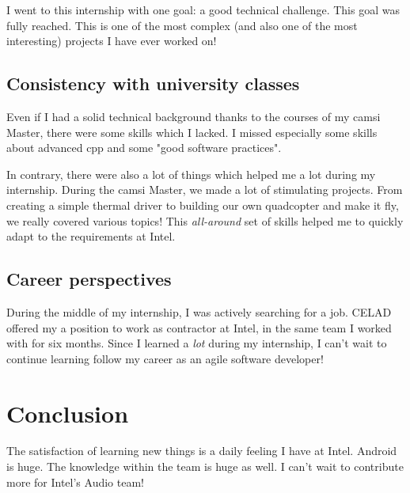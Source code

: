I went to this internship with one goal: a good technical challenge. This goal
was fully reached. This is one of the most complex (and also one of the most
interesting) projects I have ever worked on!

\subsection{Consistency with university classes}
Even if I had a solid technical background thanks to the courses of my
\gls{camsi} Master, there were some skills which I lacked.
I missed especially some skills about advanced \gls{cpp} and some "good software practices".

In contrary, there were also a lot of things which helped me a lot during
my internship.  During the \gls{camsi} Master, we made a lot of stimulating
projects. From creating a simple thermal driver to building our own quadcopter
and make it fly, we really covered various topics! This \emph{all-around} set of
skills helped me to quickly adapt to the requirements at Intel.

\subsection{Career perspectives}
During the middle of my internship, I was actively searching for a job. CELAD offered my a position to work
as contractor at Intel, in the same team I worked with for six months.
Since I learned a \emph{lot} during my internship, I can't wait to continue learning follow my career
as an agile software developer!

\section{Conclusion}
The satisfaction of learning new things is a daily feeling I have at
Intel. Android is huge. The knowledge within the team is huge as well. I can't
wait to contribute more for Intel's Audio team!
